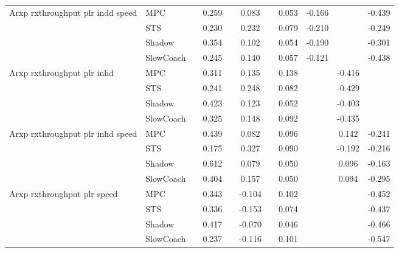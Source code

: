 \begin{tabular}{|l|l|*{9}{c|}}
\midrule
Arxp rxthroughput plr indd speed    & MPC &       &     0.259 &        &  0.083 &     &  0.053 &  -0.166 &      &   -0.439 \\
                              & STS &       &     0.230 &        &  0.232 &     &  0.079 &  -0.210 &      &   -0.249 \\
                              & Shadow &       &     0.354 &        &  0.102 &     &  0.054 &  -0.190 &      &   -0.301 \\
                              & SlowCoach &       &     0.245 &        &  0.140 &     &  0.057 &  -0.121 &      &   -0.438 \\
\midrule
Arxp rxthroughput plr inhd    & MPC &       &     0.311 &        &  0.135 &     &  0.138 &      &  -0.416 &       \\
                              & STS &       &     0.241 &        &  0.248 &     &  0.082 &      &  -0.429 &       \\
                              & Shadow &       &     0.423 &        &  0.123 &     &  0.052 &      &  -0.403 &       \\
                              & SlowCoach &       &     0.325 &        &  0.148 &     &  0.092 &      &  -0.435 &       \\
\midrule
Arxp rxthroughput plr inhd speed    & MPC &       &     0.439 &        &  0.082 &     &  0.096 &      &   0.142 &   -0.241 \\
                              & STS &       &     0.175 &        &  0.327 &     &  0.090 &      &  -0.192 &   -0.216 \\
                              & Shadow &       &     0.612 &        &  0.079 &     &  0.050 &      &   0.096 &   -0.163 \\
                              & SlowCoach &       &     0.404 &        &  0.157 &     &  0.050 &      &   0.094 &   -0.295 \\
\midrule
Arxp rxthroughput plr speed    & MPC &       &     0.343 &        & -0.104 &     &  0.102 &      &      &   -0.452 \\
                              & STS &       &     0.336 &        & -0.153 &     &  0.074 &      &      &   -0.437 \\
                              & Shadow &       &     0.417 &        & -0.070 &     &  0.046 &      &      &   -0.466 \\
                              & SlowCoach &       &     0.237 &        & -0.116 &     &  0.101 &      &      &   -0.547 \\

\end{tabular}
